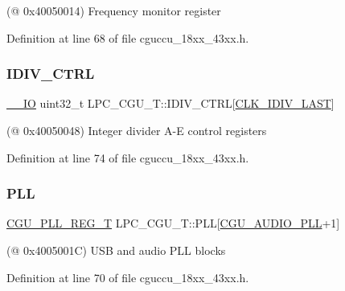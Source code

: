 (@ 0x40050014) Frequency monitor register 

Definition at line 68 of file cguccu\+\_\+18xx\+\_\+43xx.\+h.

\mbox{\label{struct_l_p_c___c_g_u___t_ab4dcc7e3d60c588f6302cf34016817dc}} 
\subsubsection{\texorpdfstring{I\+D\+I\+V\+\_\+\+C\+T\+RL}{IDIV\_CTRL}}
{\footnotesize\ttfamily \hyperlink{core__sc300_8h_aec43007d9998a0a0e01faede4133d6be}{\+\_\+\+\_\+\+IO} uint32\+\_\+t L\+P\+C\+\_\+\+C\+G\+U\+\_\+\+T\+::\+I\+D\+I\+V\+\_\+\+C\+T\+RL\mbox{[}\hyperlink{chip__clocks_8h_ad9480404e0134b79428e4c7efdd5869da6bf0e8a9dd6907d1b78038d44421b881}{C\+L\+K\+\_\+\+I\+D\+I\+V\+\_\+\+L\+A\+ST}\mbox{]}}

(@ 0x40050048) Integer divider A-\/E control registers 

Definition at line 74 of file cguccu\+\_\+18xx\+\_\+43xx.\+h.

\mbox{\label{struct_l_p_c___c_g_u___t_a8119fc2f4b51375692557471f1142301}} 
\subsubsection{\texorpdfstring{P\+LL}{PLL}}
{\footnotesize\ttfamily \hyperlink{struct_c_g_u___p_l_l___r_e_g___t}{C\+G\+U\+\_\+\+P\+L\+L\+\_\+\+R\+E\+G\+\_\+T} L\+P\+C\+\_\+\+C\+G\+U\+\_\+\+T\+::\+P\+LL\mbox{[}\hyperlink{group___c_l_o_c_k__18_x_x__43_x_x_ggabdd04536f16b3c7b588757d024e53da6a417d44002637aeeb1b62b42c39723cc1}{C\+G\+U\+\_\+\+A\+U\+D\+I\+O\+\_\+\+P\+LL}+1\mbox{]}}

(@ 0x4005001C) U\+SB and audio P\+LL blocks 

Definition at line 70 of file cguccu\+\_\+18xx\+\_\+43xx.\+h.

\mbox{\label{struct_l_p_c___c_g_u___t_a05c018f040f016782534031a9da985ee}} 
